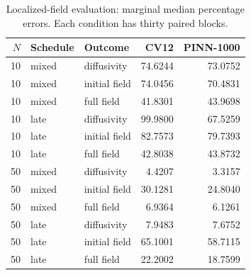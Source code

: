 \begin{table}[htbp]\centering\small
\caption{Localized-field evaluation: marginal median percentage errors. Each condition has thirty paired blocks.}\label{tab:offbasis}
\begin{tabular}{rllrr}\toprule
$N$ & Schedule & Outcome & CV12 & PINN-1000\\\midrule
10 & mixed & diffusivity & 74.6244 & 73.0752\\
10 & mixed & initial field & 74.0456 & 70.4831\\
10 & mixed & full field & 41.8301 & 43.9698\\
10 & late & diffusivity & 99.9800 & 67.5259\\
10 & late & initial field & 82.7573 & 79.7393\\
10 & late & full field & 42.8038 & 43.8732\\
50 & mixed & diffusivity & 4.4207 & 3.3157\\
50 & mixed & initial field & 30.1281 & 24.8040\\
50 & mixed & full field & 6.9364 & 6.1261\\
50 & late & diffusivity & 7.9483 & 7.6752\\
50 & late & initial field & 65.1001 & 58.7115\\
50 & late & full field & 22.2002 & 18.7599\\
\bottomrule\end{tabular}
\end{table}

